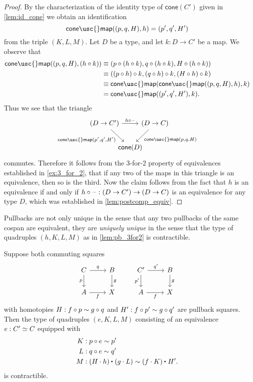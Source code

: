 \begin{proof}
By the characterization of the identity type of $\mathsf{cone}(C')$ given in \cref{lem:id_cone} we obtain an identification
\begin{equation*}
\mathsf{cone\usc{}map}((p,q,H),h)=(p',q',H')
\end{equation*}
from the triple $(K,L,M)$. 
Let $D$ be a type, and let $k:D\to C'$ be a map. We observe that
\begin{align*}
\mathsf{cone\usc{}map}((p,q,H),(h\circ k)) & \jdeq (p\circ (h\circ k),q\circ (h\circ k),H\circ (h\circ k)) \\
& \jdeq ((p\circ h)\circ k,(q\circ h)\circ k, (H\circ h)\circ k) \\
& \jdeq \mathsf{cone\usc{}map}(\mathsf{cone\usc{}map}((p,q,H),h),k) \\
& = \mathsf{cone\usc{}map}((p',q',H'),k).
\end{align*}
Thus we see that the triangle 
\begin{equation*}
\begin{tikzcd}[column sep=-1em]
(D\to C') \arrow[rr,"{h\circ \blank}"] \arrow[dr,swap,"{\mathsf{cone\usc{}map}(p',q',H')}"] & & (D\to C) \arrow[dl,"{\mathsf{cone\usc{}map}(p,q,H)}"] \\
& \mathsf{cone}(D)
\end{tikzcd}
\end{equation*}
commutes. Therefore it follows from the 3-for-2 property of equivalences established in \cref{ex:3_for_2}, that if any two of the maps in this triangle is an equivalence, then so is the third. Now the claim follows from the fact that $h$ is an equivalence if and only if $h\circ\mathord{\hspace{1pt}\text{--}\hspace{1pt}} : (D\to C')\to (D\to C)$ is an equivalence for any type $D$, which was established in \cref{lem:postcomp_equiv}.
\end{proof}

Pullbacks are not only unique in the sense that any two pullbacks of the same cospan are equivalent, they are \emph{uniquely unique} in the sense that the type of quadruples $(h,K,L,M)$ as in \cref{lem:pb_3for2} is contractible.

\begin{cor}\label{cor:uniquely-unique-pullback}
Suppose both commuting squares
\begin{equation*}
\begin{tikzcd}
C \arrow[r,"q"] \arrow[d,swap,"p"] & B \arrow[d,"g"] & {C'} \arrow[r,"{q'}"] \arrow[d,swap,"{p'}"] & B \arrow[d,"g"] \\
A \arrow[r,swap,"f"] & X & A \arrow[r,swap,"f"] & X
\end{tikzcd}
\end{equation*}
with homotopies $H:f\circ p \sim g\circ q$ and $H':f\circ p'\sim g\circ q'$ are pullback squares.
Then the type of quadruples $(e,K,L,M)$ consisting of an equivalence $e:\eqv{C'}{C}$ equipped with
\begin{align*}
K & : p\circ e \htpy p' \\
L & : q\circ e \htpy q' \\
M & : \ct{(H\cdot h)}{(g\cdot L)} \htpy \ct{(f\cdot K)}{H'}.
\end{align*}
is contractible.
\end{cor}

